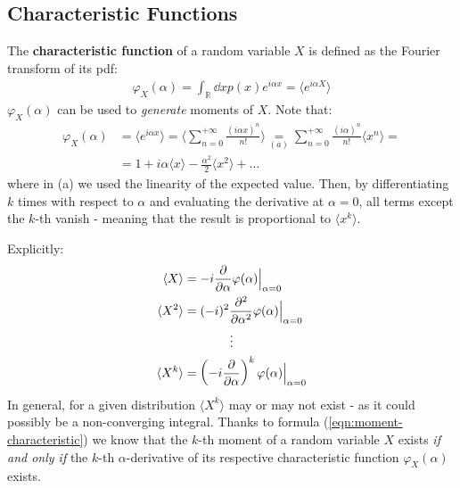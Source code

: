 \documentclass[../../main.tex]{subfiles}
\begin{document}
\subsection{Characteristic Functions}
The \textbf{characteristic function} of a random variable $X$ is defined as the Fourier transform of its pdf:
\begin{align}\label{eqn:char-func}
    \varphi_X(\alpha) = \int_{\mathbb{R}} \dd{x} p(x) e^{i \alpha x} = \langle e^{i \alpha X} \rangle
\end{align}  
$\varphi_X(\alpha)$ can be used to \textit{generate} moments of $X$. Note that:
\begin{align*}
    \varphi_X(\alpha) &= \langle e^{i \alpha x} \rangle = \langle \sum_{n=0}^{+\infty} \frac{(i \alpha x)^n}{n!} \rangle \underset{(a)}{=} \sum_{n=0}^{+\infty} \frac{(i \alpha)^n}{n!} \langle x^n \rangle  =\\
    &= 1 + i \alpha \langle x \rangle - \frac{\alpha^2}{2} \langle x^2 \rangle + \dots  
\end{align*}
where in (a) we used the linearity of the expected value. Then, by differentiating $k$ times with respect to $\alpha$ and evaluating the derivative at $\alpha = 0$, all terms except the $k$-th vanish - meaning that the result is proportional to $\langle x^k \rangle$.

Explicitly:
\begin{align}\nonumber 
    \langle X \rangle &= -i \pdv{\alpha} \varphi(\alpha) \Big|_{\alpha = 0}\\
    \langle X^2 \rangle &= (-i)^2 \pdv[2]{\alpha} \varphi(\alpha) \Big|_{\alpha = 0} \nonumber \\ \nonumber 
    \vdots \span\\ 
    \langle X^k \rangle &= \left(-i \pdv{\alpha}\right)^k \varphi(\alpha) \Big|_{\alpha = 0} \label{eqn:moment-characteristic}
\end{align}
In general, for a given distribution $\langle X^k \rangle$ may or may not exist - as it could possibly be a non-converging integral. Thanks to formula (\ref{eqn:moment-characteristic}) we know that the $k$-th moment of a random variable $X$ exists \textit{if and only if} the $k$-th $\alpha$-derivative of its respective characteristic function $\varphi_X(\alpha)$ exists.
\end{document}
